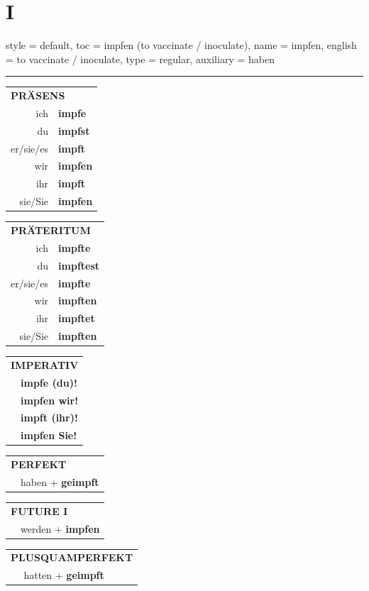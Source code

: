 \section{I}

\begin{verbentry}{
  style = {default},
  toc = {impfen (to vaccinate / inoculate)},
  name = {impfen},
  english = {to vaccinate / inoculate},
  type = {regular},
  auxiliary = {haben}
}


\vspace{5pt}
\hrule
\vspace{5pt}

\begin{tabular}{rl}
\multicolumn{2}{l}{\textbf{PRÄSENS}}\\
ich & \textbf{impfe}\\
du & \textbf{impfst}\\
er/sie/es & \textbf{impft}\\
wir & \textbf{impfen}\\
ihr & \textbf{impft}\\
sie/Sie & \textbf{impfen}\\
\end{tabular}
\hfill
\begin{tabular}{rl}
\multicolumn{2}{l}{\textbf{PRÄTERITUM}}\\
ich & \textbf{impfte}\\
du & \textbf{impftest}\\
er/sie/es & \textbf{impfte}\\
wir & \textbf{impften}\\
ihr & \textbf{impftet}\\
sie/Sie & \textbf{impften}\\
\end{tabular}
\hfill
\begin{tabular}{rl}
\multicolumn{2}{l}{\textbf{IMPERATIV}}\\
& \textbf{impfe (du)!}\\
& \textbf{impfen wir!}\\
& \textbf{impft (ihr)!}\\
& \textbf{impfen Sie!}\\
\end{tabular}

\vspace{10pt}

\begin{tabular}{rl}
\multicolumn{2}{l}{\textbf{PERFEKT}}\\
& haben + \textbf{geimpft}\\
\end{tabular}
\hfill
\begin{tabular}{rl}
\multicolumn{2}{l}{\textbf{FUTURE I}}\\
& werden + \textbf{impfen}\\
\end{tabular}
\hfill
\begin{tabular}{rl}
\multicolumn{2}{l}{\textbf{PLUSQUAMPERFEKT}}\\
& hatten + \textbf{geimpft}\\
\end{tabular}


\end{verbentry}
